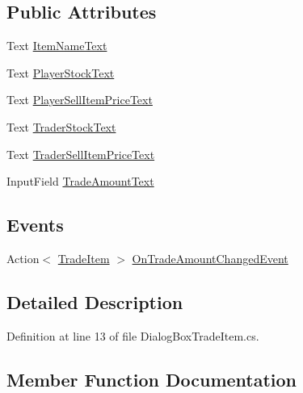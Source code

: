 \subsection*{Public Attributes}
\begin{DoxyCompactItemize}
\item 
Text \hyperlink{class_dialog_box_trade_item_acdb6abd5ca26324fdb3c122a3ed2236e}{Item\+Name\+Text}
\item 
Text \hyperlink{class_dialog_box_trade_item_a4f1a3a610d277beb48d43f22a8798d18}{Player\+Stock\+Text}
\item 
Text \hyperlink{class_dialog_box_trade_item_a35230b6cd52fce998c48f119d21fe029}{Player\+Sell\+Item\+Price\+Text}
\item 
Text \hyperlink{class_dialog_box_trade_item_ab7639573ce56c103cca58a47c99bad81}{Trader\+Stock\+Text}
\item 
Text \hyperlink{class_dialog_box_trade_item_a06c8b2cf8baace1d20eb4e63646c04d7}{Trader\+Sell\+Item\+Price\+Text}
\item 
Input\+Field \hyperlink{class_dialog_box_trade_item_a07515ab7403a11bd2c8205dae9ab98dd}{Trade\+Amount\+Text}
\end{DoxyCompactItemize}
\subsection*{Events}
\begin{DoxyCompactItemize}
\item 
Action$<$ \hyperlink{class_trade_item}{Trade\+Item} $>$ \hyperlink{class_dialog_box_trade_item_a2e95728cf97c625c7327d49ce609f66c}{On\+Trade\+Amount\+Changed\+Event}
\end{DoxyCompactItemize}


\subsection{Detailed Description}


Definition at line 13 of file Dialog\+Box\+Trade\+Item.\+cs.



\subsection{Member Function Documentation}
\mbox{\label{class_dialog_box_trade_item_ad1373047874469ad3ad00423fc90acef}} 
